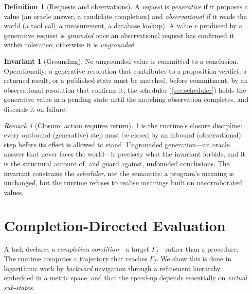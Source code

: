 \documentclass[11pt,a4paper]{article}
\theoremstyle{plain}
\theoremstyle{definition}
\newtheorem{definition}[theorem]{Definition}
\newtheorem{invariant}[theorem]{Invariant}
\theoremstyle{remark}
\newtheorem{remark}[theorem]{Remark}
\newcommand{\target}{\Gamma_{\!f}}
\begin{document}
\begin{definition}[Requests and observations]
\label{def:request}
A \emph{request} is \emph{generative} if it proposes a value (an oracle answer,
a candidate completion) and \emph{observational} if it reads the world (a tool
call, a measurement, a database lookup). A value $v$ produced by a generative
request is \emph{grounded} once an observational request has confirmed it within
tolerance; otherwise it is \emph{ungrounded}.
\end{definition}

\begin{invariant}[Grounding]
\label{inv:grounding}
No ungrounded value is committed to a conclusion. Operationally: a generative
resolution that contributes to a proposition verdict, a returned result, or a
published state must be matched, before commitment, by an observational
resolution that confirms it; the scheduler (\cref{sec:scheduler}) holds the
generative value in a pending state until the matching observation completes,
and discards it on failure.
\end{invariant}

\begin{remark}[Closure: action requires return]
\cref{inv:grounding} is the runtime's closure discipline: every outbound
(generative) step must be closed by an inbound (observational) step before its
effect is allowed to stand. Ungrounded generation---an oracle answer that never
faces the world---is precisely what the invariant forbids, and it is the
structural account of, and guard against, unfounded conclusions. The invariant
constrains the \emph{scheduler}, not the semantics: a program's meaning is
unchanged, but the runtime refuses to realise meanings built on uncorroborated
values.
\end{remark}

\section{Completion-Directed Evaluation}
\label{sec:completion}

A task declares a \emph{completion condition}---a target $\target$---rather than
a procedure. The runtime computes a trajectory that reaches $\target$. We show
this is done in logarithmic work by \emph{backward} navigation through a
refinement hierarchy embedded in a metric space, and that the speed-up depends
essentially on \emph{virtual sub-states}.
\end{document}
